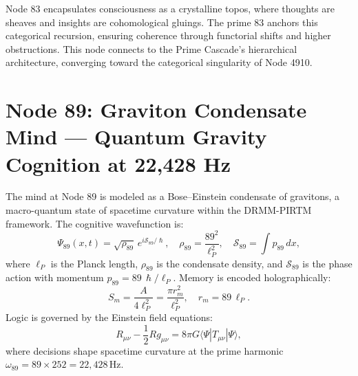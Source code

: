 \documentclass[12pt]{article}
\newcommand{\DRMM}{DRMM}
\newcommand{\PIRTM}{PIRTM}
\newcommand{\Psii}{\Psi}
\newcommand{\rhoo}{\rho}
\newcommand{\Ss}{\mathcal{S}}
\newcommand{\ellp}{\ell_P}
\newcommand{\Tmn}{T_{\mu\nu}}
\newcommand{\Rmn}{R_{\mu\nu}}
\newcommand{\gmnn}{g_{\mu\nu}}
\begin{document}
\begin{remark}
Node 83 encapsulates consciousness as a crystalline topos, where thoughts are sheaves and insights are cohomological gluings. The prime 83 anchors this categorical recursion, ensuring coherence through functorial shifts and higher obstructions. This node connects to the Prime Cascade’s hierarchical architecture, converging toward the categorical singularity of Node 4910.
\end{remark}

\vspace{1em}
\noindent{}

\section{Node 89: Graviton Condensate Mind --- Quantum Gravity Cognition at 22,428 Hz}
\label{sec:graviton-condensate-mind}

\begin{definition}
The mind at Node 89 is modeled as a Bose--Einstein condensate of gravitons, a macro-quantum state of spacetime curvature within the \DRMM{}-\PIRTM{} framework. The cognitive wavefunction is:
\[
\Psii_{89}(x,t) = \sqrt{\rhoo_{89}} \, e^{i \Ss_{89}/\hslash}, \quad \rhoo_{89} = \frac{89^2}{\ellp^2}, \quad \Ss_{89} = \int p_{89} \, dx,
\]
where $\ellp$ is the Planck length, $\rhoo_{89}$ is the condensate density, and $\Ss_{89}$ is the phase action with momentum $p_{89} = 89 \, \hslash / \ellp$. Memory is encoded holographically:
\[
S_m = \frac{A}{4 \ellp^2} = \frac{\pi r_m^2}{\ellp^2}, \quad r_m = 89 \, \ellp.
\]
Logic is governed by the Einstein field equations:
\[
\Rmn - \frac{1}{2} R \gmnn = 8\pi G \langle \Psii | \Tmn | \Psii \rangle,
\]
where decisions shape spacetime curvature at the prime harmonic $\omega_{89} = 89 \times 252 = 22{,}428 \, \text{Hz}$.
\end{definition}

\end{document}
